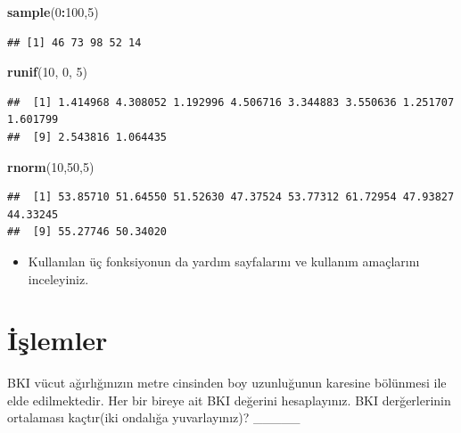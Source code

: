 \documentclass[
  oneside]{book}
\newenvironment{Shaded}{\begin{snugshade}}{\end{snugshade}}
\newcommand{\DecValTok}[1]{\textcolor[rgb]{0.00,0.00,0.81}{#1}}
\newcommand{\FunctionTok}[1]{\textcolor[rgb]{0.13,0.29,0.53}{\textbf{#1}}}
\newcommand{\NormalTok}[1]{#1}
\newcommand{\SpecialCharTok}[1]{\textcolor[rgb]{0.81,0.36,0.00}{\textbf{#1}}}
\providecommand{\tightlist}{%
  \setlength{\itemsep}{0pt}\setlength{\parskip}{0pt}}
\begin{document}
\begin{Shaded}
\begin{Highlighting}[]
\FunctionTok{sample}\NormalTok{(}\DecValTok{0}\SpecialCharTok{:}\DecValTok{100}\NormalTok{,}\DecValTok{5}\NormalTok{)}
\end{Highlighting}
\end{Shaded}

\begin{verbatim}
## [1] 46 73 98 52 14
\end{verbatim}

\begin{Shaded}
\begin{Highlighting}[]
\FunctionTok{runif}\NormalTok{(}\DecValTok{10}\NormalTok{,  }\DecValTok{0}\NormalTok{, }\DecValTok{5}\NormalTok{)}
\end{Highlighting}
\end{Shaded}

\begin{verbatim}
##  [1] 1.414968 4.308052 1.192996 4.506716 3.344883 3.550636 1.251707 1.601799
##  [9] 2.543816 1.064435
\end{verbatim}

\begin{Shaded}
\begin{Highlighting}[]
\FunctionTok{rnorm}\NormalTok{(}\DecValTok{10}\NormalTok{,}\DecValTok{50}\NormalTok{,}\DecValTok{5}\NormalTok{)}
\end{Highlighting}
\end{Shaded}

\begin{verbatim}
##  [1] 53.85710 51.64550 51.52630 47.37524 53.77312 61.72954 47.93827 44.33245
##  [9] 55.27746 50.34020
\end{verbatim}

\begin{itemize}
\tightlist
\item
  Kullanılan üç fonksiyonun da yardım sayfalarını ve kullanım amaçlarını inceleyiniz.
\end{itemize}

\hypertarget{iux15flemler-1}{%
\section{İşlemler}\label{iux15flemler-1}}

BKI vücut ağırlığınızın metre cinsinden boy uzunluğunun karesine bölünmesi ile elde edilmektedir. Her bir bireye ait BKI değerini hesaplayınız. BKI derğerlerinin ortalaması kaçtır(iki ondalığa yuvarlayınız)? \_\_\_\_\_
\end{document}
